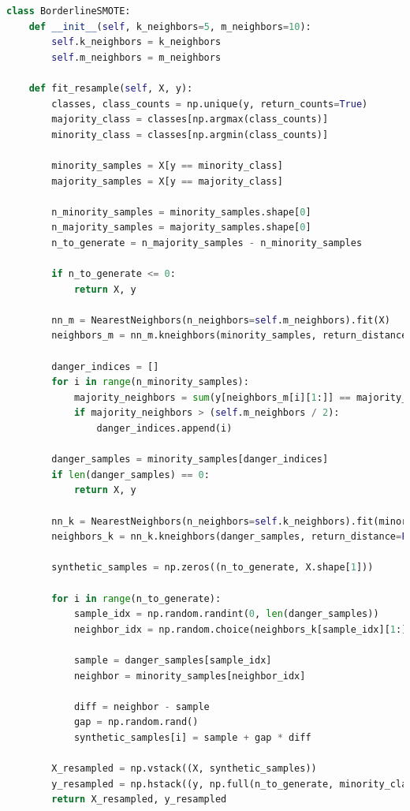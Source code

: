 \begin{lstlisting}[language=Python]
class BorderlineSMOTE:
    def __init__(self, k_neighbors=5, m_neighbors=10):
        self.k_neighbors = k_neighbors
        self.m_neighbors = m_neighbors

    def fit_resample(self, X, y):
        classes, class_counts = np.unique(y, return_counts=True)
        majority_class = classes[np.argmax(class_counts)]
        minority_class = classes[np.argmin(class_counts)]

        minority_samples = X[y == minority_class]
        majority_samples = X[y == majority_class]

        n_minority_samples = minority_samples.shape[0]
        n_majority_samples = majority_samples.shape[0]
        n_to_generate = n_majority_samples - n_minority_samples

        if n_to_generate <= 0:
            return X, y

        nn_m = NearestNeighbors(n_neighbors=self.m_neighbors).fit(X)
        neighbors_m = nn_m.kneighbors(minority_samples, return_distance=False)

        danger_indices = []
        for i in range(n_minority_samples):
            majority_neighbors = sum(y[neighbors_m[i][1:]] == majority_class)
            if majority_neighbors > (self.m_neighbors / 2):
                danger_indices.append(i)
        
        danger_samples = minority_samples[danger_indices]
        if len(danger_samples) == 0:
            return X, y

        nn_k = NearestNeighbors(n_neighbors=self.k_neighbors).fit(minority_samples)
        neighbors_k = nn_k.kneighbors(danger_samples, return_distance=False)

        synthetic_samples = np.zeros((n_to_generate, X.shape[1]))

        for i in range(n_to_generate):
            sample_idx = np.random.randint(0, len(danger_samples))
            neighbor_idx = np.random.choice(neighbors_k[sample_idx][1:])
            
            sample = danger_samples[sample_idx]
            neighbor = minority_samples[neighbor_idx]
            
            diff = neighbor - sample
            gap = np.random.rand()
            synthetic_samples[i] = sample + gap * diff

        X_resampled = np.vstack((X, synthetic_samples))
        y_resampled = np.hstack((y, np.full(n_to_generate, minority_class)))
        return X_resampled, y_resampled
\end{lstlisting}

